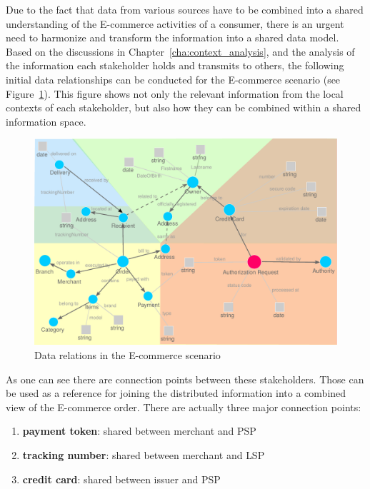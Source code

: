 Due to the fact that data from various sources have to be combined into a shared understanding of the \gls{E-commerce} activities of a consumer, there is an urgent need to harmonize and transform the information into a shared data model. Based on the discussions in Chapter~\ref{cha:context_analysis}, and the analysis of the information each stakeholder holds and transmits to others, the following initial data relationships can be conducted for the \gls{E-commerce} scenario (see Figure~\ref{fig:images_data_model}). This figure shows not only the relevant information from the local contexts of each stakeholder, but also how they can be combined within a shared information space. \\

\begin{figure}[!ht]
  \centering
  \includegraphics[width=0.9\columnwidth]{images/ontology_scenario_1.pdf}
  \caption{Data relations in the \gls{E-commerce} scenario\protect\footnotemark}
\label{fig:images_data_model}
\end{figure}

As one can see there are connection points between these stakeholders. Those can be used as a reference for joining the distributed information into a combined view of the \gls{E-commerce} order. There are actually three major connection points: \@

\begin{enumerate}
  \item \textbf{payment token}: shared between merchant and \gls{PSP}
  \item \textbf{tracking number}: shared between merchant and \gls{LSP}
  \item \textbf{credit card}: shared between issuer and \gls{PSP}
\end{enumerate}

